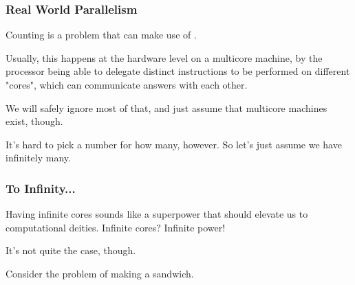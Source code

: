 \documentclass[aspectratio=169]{beamer}
\begin{document}
\begin{frame}[fragile]
  \frametitle{Real World Parallelism}

  Counting is a problem that can make use of .

  \pause
  \vspace{\fill}


  \pause
  \vspace{\fill}

  Usually, this happens at the hardware level on a multicore machine, by the processor being
  able to delegate distinct instructions to be performed on different "cores", which can
  communicate answers with each other.

  \pause
  \vspace{\fill}

  We will safely ignore most of that, and just assume that multicore machines exist, though.

  \pause
  \vspace{\fill}

  It's hard to pick a number for how many, however. So let's just assume we have infinitely many.
\end{frame}

\begin{frame}[fragile]
  \frametitle{To Infinity...}

  Having infinite cores sounds like a superpower that should elevate us to computational deities.
  Infinite cores? Infinite power!

  \pause
  \vspace{\fill}

  It's not quite the case, though.

  \pause
  \vspace{\fill}

  Consider the problem of making a sandwich.
\end{frame}
\end{document}
